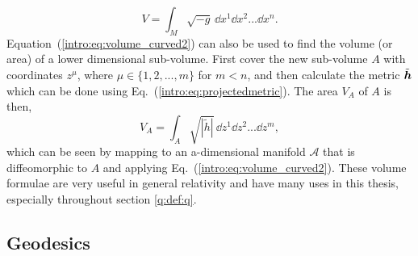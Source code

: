 \begin{equation}
V = \int_{M}\sqrt{-g} \,\dd {x}^1 \dd {x}^2 ... \dd {x}^n.
\end{equation}
Equation~(\ref{intro:eq:volume_curved2}) can also be used to find the volume (or area) of a lower dimensional sub-volume. First cover the new sub-volume $A$ with coordinates $z^\mu$, where $\mu\in\{1,2,...,m\}$ for $m<n$, and then calculate the metric $\tilde{\boldsymbol{h}}$ which can be done using Eq.~(\ref{intro:eq:projectedmetric}). The area $V_A$ of $A$ is then, 
\begin{equation} \label{intro:eq:area_int}
V_A = \int_{A}\sqrt{|\tilde{h}|} \,\dd {z}^1 \dd {z}^2 ... \dd {z}^m,
\end{equation}
which can be seen by mapping to an a-dimensional manifold $\mathcal{A}$ that is diffeomorphic to $A$ and applying Eq.~(\ref{intro:eq:volume_curved2}). These volume formulae are very useful in general relativity and have many uses in this thesis, especially throughout section \ref{q:def:q}.


 \subsection{Geodesics} \label{intro:sec:geodesics}


